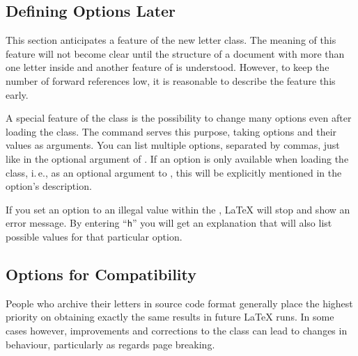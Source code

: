 \subsection{Defining Options Later}
\label{sec:scrlttr2.options.late}

This section anticipates a feature of the new letter class. The
meaning of this feature will not become clear until the structure of a
document with more than one letter inside and another feature of
 is understood. However, to keep the number of forward
references low, it is reasonable to describe the feature this early.

\begin{Declaration}
\end{Declaration}
%
A special feature of the  class is the possibility to
change many options even after loading the class. The
 command serves this purpose, taking options and
their values as arguments. You can list multiple options, separated by
commas, just like in the optional argument of
. If an option is only available when loading the
class, i.\,e., as an optional argument to , this
will be explicitly mentioned in the option's description.

\begin{Explain}
  If you set an option to an illegal value within the , {\LaTeX} will stop and show an error message. By entering
  ``\texttt{h}'' you will get an explanation that will also list
  possible values for that particular option.
\end{Explain}
%
%
%

\subsection{Options for  Compatibility}
\label{sec:scrlttr2.compatibilityOptions}
%

People who archive their letters in source code format generally place
the highest priority on obtaining exactly the same results in future
{\LaTeX} runs. In some cases however, improvements and corrections to
the class can lead to changes in behaviour, particularly as regards
page breaking.

